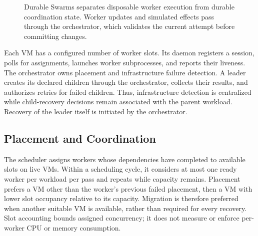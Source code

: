 \begin{figure}[t]
  \centering
  \caption{Durable Swarms separates disposable worker execution from durable
  coordination state. Worker updates and simulated effects pass through the
  orchestrator, which validates the current attempt before committing changes.}
  \label{fig:architecture}
\end{figure}

Each VM has a configured number of worker slots. Its daemon registers a session,
polls for assignments, launches worker subprocesses, and reports their liveness.
The orchestrator owns placement and infrastructure failure detection. A leader
creates its declared children through the orchestrator, collects their results,
and authorizes retries for failed children. Thus, infrastructure detection is
centralized while child-recovery decisions remain associated with the parent
workload. Recovery of the leader itself is initiated by the orchestrator.

\subsection{Placement and Coordination}
\label{sec:placement}

The scheduler assigns workers whose dependencies have completed to available
slots on live VMs. Within a scheduling cycle, it considers at most one ready
worker per workload per pass and repeats while capacity remains. Placement
prefers a VM other than the worker's previous failed placement, then a VM with
lower slot occupancy relative to its capacity. Migration is therefore preferred
when another suitable VM is available, rather than required for every recovery.
Slot accounting bounds assigned concurrency; it does not measure or enforce
per-worker CPU or memory consumption.

